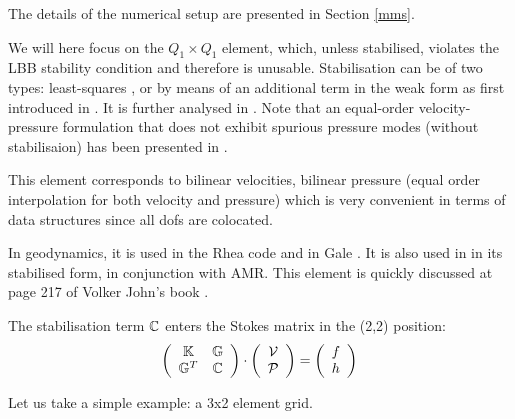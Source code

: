 The details of the numerical setup are presented in Section \ref{mms}.

We will here focus on the $Q_1 \times Q_1$ element, which, unless stabilised,
violates  the LBB stability condition and therefore is unusable. 
Stabilisation can be of two types: least-squares \cite{dohu03,temr92,kibr,gubl06},
or by means of an additional term in the weak form as first introduced in \cite{dobo04,bodg06}.
It is further analysed in \cite{nosi01,lihc09}.
Note that an equal-order velocity-pressure formulation that does not exhibit spurious
pressure modes (without stabilisaion) has been presented in \cite{risc86}.

This element corresponds to bilinear velocities, bilinear pressure 
(equal order interpolation for both velocity and pressure) which is 
very convenient in terms of data structures since all dofs are colocated.

In geodynamics, it is used in the Rhea code \cite{stgb10,busa13} and in Gale \cite{arbi13}.
It is also used in \cite{lezh11} in its stabilised form, in conjunction with AMR. 
This element is quickly discussed at page 217 of Volker John's book \cite{john16}.

The stabilisation term ${\mathbb{C}}$ enters the Stokes matrix in the (2,2) position:
\[
\left(
\begin{array}{cc}
{\mathbb{K}} & {\mathbb{G}} \\ {\mathbb{G}}^T & {\mathbb{C}} 
\end{array}
\right)
\cdot
\left(
\begin{array}{c}
{\cal V} \\ {\cal P}
\end{array}
\right)
=
\left(
\begin{array}{c}
 f \\ h
\end{array}
\right)
\]

Let us take a simple example: a 3x2 element grid.

